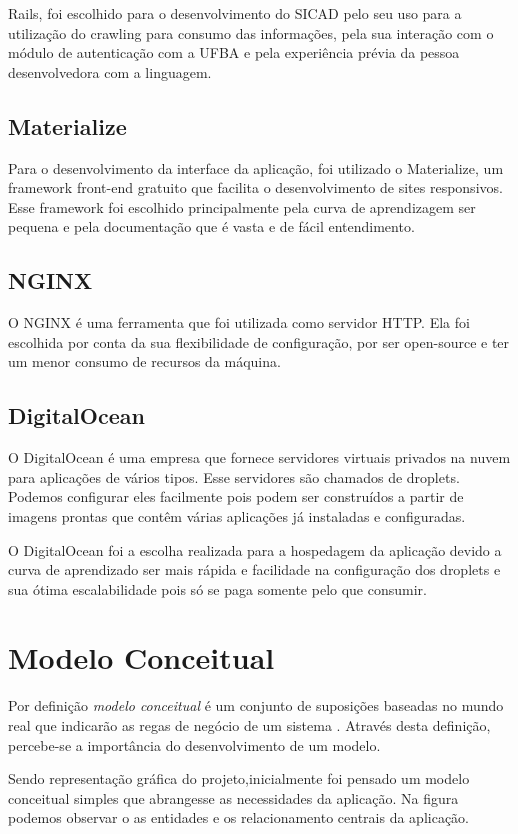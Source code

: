 \documentclass[12pt, a4paper]{report}
\begin{document}
Rails, foi escolhido para o desenvolvimento do SICAD pelo seu uso para a utilização do crawling para consumo das informações, pela sua interação com o módulo de autenticação com a UFBA e pela experiência prévia da pessoa desenvolvedora com a linguagem.

\subsection{Materialize}
Para o desenvolvimento da interface da aplicação, foi utilizado o Materialize, um framework front-end gratuito que facilita o desenvolvimento de sites responsivos.
Esse framework foi escolhido principalmente pela curva de aprendizagem ser pequena e pela documentação que é vasta e de fácil entendimento.

\subsection{NGINX}
O NGINX é uma ferramenta que foi utilizada como servidor HTTP. Ela foi escolhida por conta da sua flexibilidade de configuração, por ser open-source e ter um menor consumo de recursos da máquina.

\subsection{DigitalOcean}
O DigitalOcean é uma empresa que fornece servidores virtuais privados na nuvem para aplicações de vários tipos. Esse servidores são chamados de droplets. Podemos configurar eles facilmente pois podem ser construídos a partir de imagens prontas que contêm várias aplicações já instaladas e configuradas.

O DigitalOcean foi a escolha realizada para a hospedagem da aplicação devido a curva de aprendizado ser mais rápida e facilidade na configuração dos droplets e sua ótima escalabilidade pois só se paga somente pelo que consumir. 


\section{Modelo Conceitual}
\label{section:modelo}

Por definição \textit{modelo conceitual} é um conjunto de suposições baseadas no mundo real que indicarão as regas de negócio de um sistema \citep{mapaconceitual}. Através desta definição, percebe-se a importância do desenvolvimento de um modelo.

Sendo representação gráfica do projeto,inicialmente foi pensado um modelo conceitual simples que abrangesse as necessidades da aplicação. Na figura podemos observar o as entidades e os relacionamento centrais da aplicação.
\end{document}
